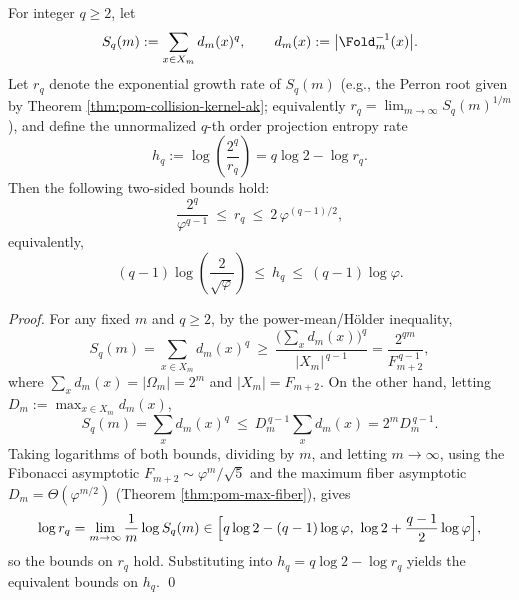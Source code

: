 \begin{proposition}\label{prop:pom-rq-universal-bounds}
For integer \(q\ge 2\), let
$$
S_q(m):=\sum_{x\in X_m} d_m(x)^q,\qquad d_m(x):=\bigl|\Fold_m^{-1}(x)\bigr|.
$$
Let \(r_q\) denote the exponential growth rate of \(S_q(m)\) (e.g., the Perron root given by Theorem \ref{thm:pom-collision-kernel-ak}; equivalently \(r_q=\lim_{m\to\infty}S_q(m)^{1/m}\)), and define the unnormalized \(q\)-th order projection entropy rate
$$
h_q:=\log\!\left(\frac{2^q}{r_q}\right)=q\log 2-\log r_q.
$$
Then the following two-sided bounds hold:
$$
\frac{2^q}{\varphi^{q-1}}\ \le\ r_q\ \le\ 2\,\varphi^{(q-1)/2},
$$
equivalently,
$$
(q-1)\log\!\left(\frac{2}{\sqrt{\varphi}}\right)\ \le\ h_q\ \le\ (q-1)\log\varphi.
$$
\end{proposition}
\begin{proof}
For any fixed \(m\) and \(q\ge 2\), by the power-mean/H\"older inequality,
$$
S_q(m)=\sum_{x\in X_m}d_m(x)^q\ \ge\ \frac{\bigl(\sum_x d_m(x)\bigr)^q}{|X_m|^{\,q-1}}
=\frac{2^{qm}}{F_{m+2}^{\,q-1}},
$$
where \(\sum_x d_m(x)=|\Omega_m|=2^m\) and \(|X_m|=F_{m+2}\).
On the other hand, letting \(D_m:=\max_{x\in X_m} d_m(x)\),
$$
S_q(m)=\sum_x d_m(x)^q\ \le\ D_m^{\,q-1}\sum_x d_m(x)=2^m D_m^{\,q-1}.
$$
Taking logarithms of both bounds, dividing by \(m\), and letting \(m\to\infty\), using the Fibonacci asymptotic \(F_{m+2}\sim \varphi^{m}/\sqrt5\) and the maximum fiber asymptotic \(D_m=\Theta(\varphi^{m/2})\) (Theorem \ref{thm:pom-max-fiber}), gives
$$
\log r_q=\lim_{m\to\infty}\frac{1}{m}\log S_q(m)\in\Bigl[q\log 2-(q-1)\log\varphi,\ \log 2+\frac{q-1}{2}\log\varphi\Bigr],
$$
so the bounds on \(r_q\) hold. Substituting into \(h_q=q\log 2-\log r_q\) yields the equivalent bounds on \(h_q\). \qed
\end{proof}

